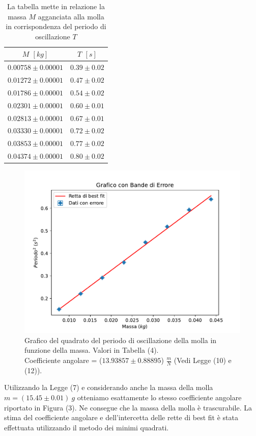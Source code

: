 \documentclass[11pt]{article}
\begin{document}
\begin{table}[H]
\centering
\begin{tabular}{|c|c|}
\hline
\textbf{$M$ $[kg]$} & \textbf{$T$ $[s]$} \\
\hline
$0.00758\pm 0.00001$ & $0.39\pm 0.02$ \\
$0.01272\pm 0.00001$ & $0.47\pm 0.02$ \\
$0.01786\pm 0.00001$ & $0.54\pm 0.02$ \\
$0.02301\pm 0.00001$ & $0.60\pm 0.01$ \\
$0.02813\pm 0.00001$ & $0.67\pm 0.01$ \\
$0.03330\pm 0.00001$ & $0.72\pm 0.02$ \\
$0.03853\pm 0.00001$ & $0.77\pm 0.02$ \\
$0.04374\pm 0.00001$ & $0.80\pm 0.02$ \\
\hline
\end{tabular}
\caption{La tabella mette in relazione la massa $M$ agganciata alla molla in corrispondenza del periodo di oscillazione $T$}
\label{tab:}
\end{table}
\begin{figure}[H]
  \centering
  \includegraphics[width=1\textwidth]{grafico1p2.pdf}
  \caption{Grafico del quadrato del periodo di oscillazione della molla in funzione della massa. Valori in Tabella (4). \\
    Coefficiente angolare = ($13.93857\pm 0.88895$) $\frac{m}{N}$ (Vedi Legge (10) e (12)).}
\end{figure}
Utilizzando la Legge (7) e considerando anche la massa della molla $m = (15.45\pm 0.01)\ g$ otteniamo esattamente lo stesso coefficiente angolare riportato in Figura (3). Ne consegue che la massa della molla è trascurabile. La stima del coefficiente angolare e dell'intercetta delle rette di best fit è stata effettuata utilizzando il metodo dei minimi quadrati.
\end{document}
